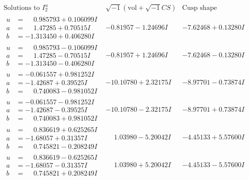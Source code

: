 \documentclass[1p]{elsarticle_modified}
\theoremstyle{definition}
\newcommand{\I}{\sqrt{-1}}
\begin{document}
$$\begin{array}{c|c|c}  
\text{Solutions to }I^u_{2}& \I (\text{vol} + \sqrt{-1}CS) & \text{Cusp shape}\\
 \hline 
\begin{aligned}
u &= \phantom{-}0.985793 + 0.106099 I \\
a &= \phantom{-}1.47285 + 0.70515 I \\
b &= -1.313450 + 0.406280 I\end{aligned}
 & -0.81957 - 1.24696 I & -7.62468 + 0.13280 I \\ \hline\begin{aligned}
u &= \phantom{-}0.985793 - 0.106099 I \\
a &= \phantom{-}1.47285 - 0.70515 I \\
b &= -1.313450 - 0.406280 I\end{aligned}
 & -0.81957 + 1.24696 I & -7.62468 - 0.13280 I \\ \hline\begin{aligned}
u &= -0.061557 + 0.981252 I \\
a &= -1.42687 + 0.39525 I \\
b &= \phantom{-}0.740083 - 0.981052 I\end{aligned}
 & -10.10780 + 2.32175 I & -8.97701 - 0.73874 I \\ \hline\begin{aligned}
u &= -0.061557 - 0.981252 I \\
a &= -1.42687 - 0.39525 I \\
b &= \phantom{-}0.740083 + 0.981052 I\end{aligned}
 & -10.10780 - 2.32175 I & -8.97701 + 0.73874 I \\ \hline\begin{aligned}
u &= \phantom{-}0.836619 + 0.625265 I \\
a &= -1.68057 + 0.31357 I \\
b &= \phantom{-}0.745821 - 0.208249 I\end{aligned}
 & \phantom{-}1.03980 - 5.20042 I & -4.45133 + 5.57600 I \\ \hline\begin{aligned}
u &= \phantom{-}0.836619 - 0.625265 I \\
a &= -1.68057 - 0.31357 I \\
b &= \phantom{-}0.745821 + 0.208249 I\end{aligned}
 & \phantom{-}1.03980 + 5.20042 I & -4.45133 - 5.57600 I \\ \hline\begin{aligned}

\end{aligned}
\end{array}$$
\end{document}
